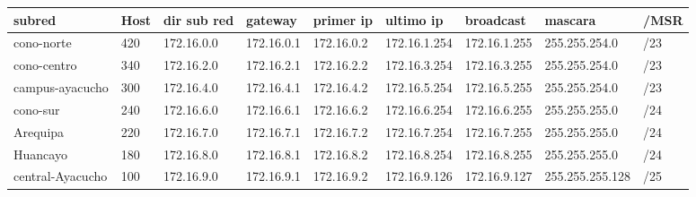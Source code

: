 \begin{landscape}
\begin{table}[htbp]
\begin{tabular}{|l|l|l|l|l|l|l|l|l|}
\hline
\rowcolor[HTML]{32CB00} 
\textbf{subred}  & \textbf{Host} & \textbf{dir sub red} & \textbf{gateway} & \textbf{primer ip} & \textbf{ultimo ip} & \textbf{broadcast} & \textbf{mascara} & \textbf{/MSR} \\ \hline
cono-norte       & 420           & 172.16.0.0           & 172.16.0.1       & 172.16.0.2         & 172.16.1.254       & 172.16.1.255       & 255.255.254.0    & /23           \\ \hline
cono-centro      & 340           & 172.16.2.0           & 172.16.2.1       & 172.16.2.2         & 172.16.3.254       & 172.16.3.255       & 255.255.254.0    & /23           \\ \hline
campus-ayacucho  & 300           & 172.16.4.0           & 172.16.4.1       & 172.16.4.2         & 172.16.5.254       & 172.16.5.255       & 255.255.254.0    & /23           \\ \hline
cono-sur         & 240           & 172.16.6.0           & 172.16.6.1       & 172.16.6.2         & 172.16.6.254       & 172.16.6.255       & 255.255.255.0    & /24           \\ \hline
Arequipa         & 220           & 172.16.7.0           & 172.16.7.1       & 172.16.7.2         & 172.16.7.254       & 172.16.7.255       & 255.255.255.0    & /24           \\ \hline
Huancayo         & 180           & 172.16.8.0           & 172.16.8.1       & 172.16.8.2         & 172.16.8.254       & 172.16.8.255       & 255.255.255.0    & /24           \\ \hline
central-Ayacucho & 100           & 172.16.9.0           & 172.16.9.1       & 172.16.9.2         & 172.16.9.126       & 172.16.9.127       & 255.255.255.128  & /25           \\ \hline
\end{tabular}
\end{table}


\end{landscape}
